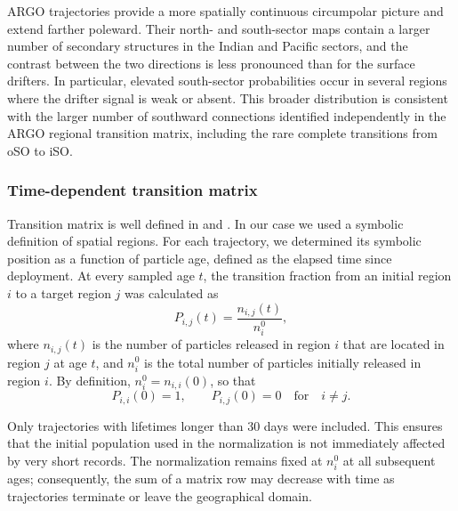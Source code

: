 \documentclass[
  draft
]{agujournal2025}
\begin{document}
                ARGO trajectories provide a more spatially continuous circumpolar picture and extend farther poleward. Their north- and south-sector maps contain a larger number of secondary structures in the Indian and Pacific sectors, and the contrast between the two directions is less pronounced than for the surface drifters. In particular, elevated south-sector probabilities occur in several regions where the drifter signal is weak or absent. This broader distribution is consistent with the larger number of southward connections identified independently in the ARGO regional transition matrix, including the rare complete transitions from oSO to iSO.

        \subsubsection{Time-dependent transition matrix}
            Transition matrix is well defined in \cite{art:sevellec2017} and \cite{art:chamberlain2023}. In our case we used a symbolic definition of spatial regions. For each trajectory, we determined its symbolic position as a function of particle age, defined as the elapsed time since deployment. At every sampled age $t$, the transition fraction from an initial region $i$ to a target region $j$ was calculated as
            \begin{equation}
                P_{i,j}(t) = \frac{n_{i,j}(t)}{n_i^0},
                \label{eq:transition_probability}
            \end{equation}
            where $n_{i,j}(t)$ is the number of particles released in region $i$ that are located in region $j$ at age $t$, and $n_i^0$ is the total number of particles initially released in region $i$. By definition, $n_i^0=n_{i,i}(0)$, so that
            \begin{equation}
                P_{i,i}(0)=1,
                \qquad
                P_{i,j}(0)=0
                \quad\text{for}\quad i\neq j.
            \end{equation}

            Only trajectories with lifetimes longer than $30$ days were included. This ensures that the initial population used in the normalization is not immediately affected by very short records. The normalization remains fixed at $n_i^0$ at all subsequent ages; consequently, the sum of a matrix row may decrease with time as trajectories terminate or leave the geographical domain.
\end{document}
